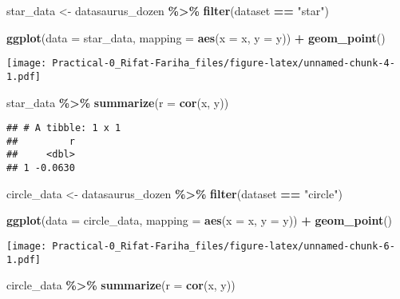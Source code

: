 \documentclass[
]{article}
\newenvironment{Shaded}{\begin{snugshade}}{\end{snugshade}}
\newcommand{\AttributeTok}[1]{\textcolor[rgb]{0.13,0.29,0.53}{#1}}
\newcommand{\FunctionTok}[1]{\textcolor[rgb]{0.13,0.29,0.53}{\textbf{#1}}}
\newcommand{\NormalTok}[1]{#1}
\newcommand{\OtherTok}[1]{\textcolor[rgb]{0.56,0.35,0.01}{#1}}
\newcommand{\SpecialCharTok}[1]{\textcolor[rgb]{0.81,0.36,0.00}{\textbf{#1}}}
\newcommand{\StringTok}[1]{\textcolor[rgb]{0.31,0.60,0.02}{#1}}
\begin{document}
\begin{Shaded}
\begin{Highlighting}[]
\NormalTok{star\_data }\OtherTok{\textless{}{-}}\NormalTok{ datasaurus\_dozen }\SpecialCharTok{\%\textgreater{}\%}
  \FunctionTok{filter}\NormalTok{(dataset }\SpecialCharTok{==} \StringTok{"star"}\NormalTok{)}

\FunctionTok{ggplot}\NormalTok{(}\AttributeTok{data =}\NormalTok{ star\_data, }\AttributeTok{mapping =} \FunctionTok{aes}\NormalTok{(}\AttributeTok{x =}\NormalTok{ x, }\AttributeTok{y =}\NormalTok{ y)) }\SpecialCharTok{+}
  \FunctionTok{geom\_point}\NormalTok{()}
\end{Highlighting}
\end{Shaded}

\texttt{[image: Practical-0\_Rifat-Fariha\_files/figure-latex/unnamed-chunk-4-1.pdf]}

\begin{Shaded}
\begin{Highlighting}[]
\NormalTok{star\_data }\SpecialCharTok{\%\textgreater{}\%}
  \FunctionTok{summarize}\NormalTok{(}\AttributeTok{r =} \FunctionTok{cor}\NormalTok{(x, y))}
\end{Highlighting}
\end{Shaded}

\begin{verbatim}
## # A tibble: 1 x 1
##         r
##     <dbl>
## 1 -0.0630
\end{verbatim}

\begin{Shaded}
\begin{Highlighting}[]
\NormalTok{circle\_data }\OtherTok{\textless{}{-}}\NormalTok{ datasaurus\_dozen }\SpecialCharTok{\%\textgreater{}\%}
  \FunctionTok{filter}\NormalTok{(dataset }\SpecialCharTok{==} \StringTok{"circle"}\NormalTok{)}

\FunctionTok{ggplot}\NormalTok{(}\AttributeTok{data =}\NormalTok{ circle\_data, }\AttributeTok{mapping =} \FunctionTok{aes}\NormalTok{(}\AttributeTok{x =}\NormalTok{ x, }\AttributeTok{y =}\NormalTok{ y)) }\SpecialCharTok{+}
  \FunctionTok{geom\_point}\NormalTok{()}
\end{Highlighting}
\end{Shaded}

\texttt{[image: Practical-0\_Rifat-Fariha\_files/figure-latex/unnamed-chunk-6-1.pdf]}

\begin{Shaded}
\begin{Highlighting}[]
\NormalTok{circle\_data }\SpecialCharTok{\%\textgreater{}\%}
  \FunctionTok{summarize}\NormalTok{(}\AttributeTok{r =} \FunctionTok{cor}\NormalTok{(x, y))}
\end{Highlighting}
\end{Shaded}
\end{document}
